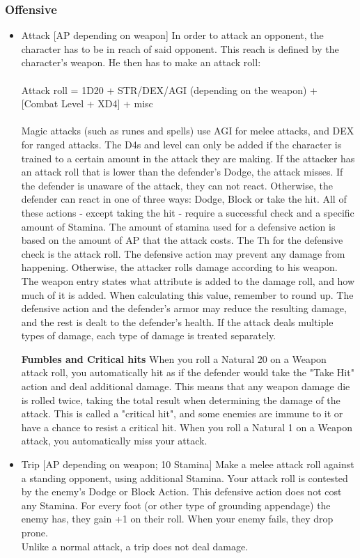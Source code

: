 \subsubsection{Offensive}\label{subsubsec:offensiveStaticCombatActions}
\begin{itemize}
\item Attack [AP depending on weapon]
In order to attack an opponent, the character has to be in reach of said opponent.
This reach is defined by the character's weapon.
He then has to make an attack roll:\\
\\
Attack roll = 1D20 + STR/DEX/AGI (depending on the weapon) + [Combat Level + XD4] + misc
\\
\\
Magic attacks (such as runes and spells) use AGI for melee attacks, and DEX for ranged attacks.
The D4s and level can only be added if the character is trained to a certain amount in the attack they are making.
If the attacker has an attack roll that is lower than the defender's Dodge, the attack misses.
If the defender is unaware of the attack, they can not react.
Otherwise, the defender can react in one of three ways: Dodge, Block or take the hit.
All of these actions - except taking the hit - require a successful check and a specific amount of Stamina.
The amount of stamina used for a defensive action is based on the amount of  AP that the attack costs.
The Th for the defensive check is the attack roll.
The defensive action may prevent any damage from happening.
Otherwise, the attacker rolls damage according to his weapon.
The weapon entry states what attribute is added to the damage roll, and how much of it is added.
When calculating this value, remember to round up.
The defensive action and the defender's armor may reduce the resulting damage, and the rest is dealt to the defender's health.
If the attack deals multiple types of damage, each type of damage is treated separately.


\textbf{Fumbles and Critical hits}
When you roll a Natural 20 on a Weapon attack roll, you automatically hit as if the defender would take the "Take Hit" action and deal additional damage.
This means that any weapon damage die is rolled twice, taking the total result when determining the damage of the attack.
This is called a "critical hit", and some enemies are immune to it or have a chance to resist a critical hit.
When you roll a Natural 1 on a Weapon attack, you automatically miss your attack.


\item Trip [AP depending on weapon; 10 Stamina]
Make a melee attack roll against a standing opponent, using additional Stamina.
Your attack roll is contested by the enemy's Dodge or Block Action.
This defensive action does not cost any Stamina.
For every foot (or other type of grounding appendage) the enemy has, they gain +1 on their roll.
When your enemy fails, they drop prone.\\
Unlike a normal attack, a trip does not deal damage.\\



\end{itemize}
